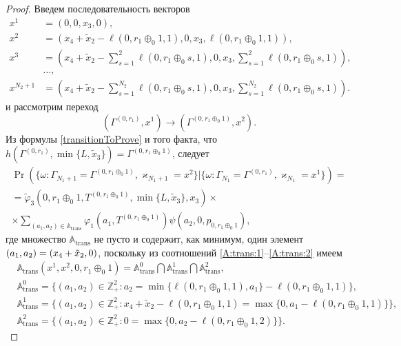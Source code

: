 \begin{proof}
Введем последовательность векторов
\begin{align*}
    x^1 &= (0,  0, x_3,  0), \\
    x^2 &= (x_4 + \tilde{x}_2 - \ell(0, r_1 \oplus_0 1, 1),  0,  x_3,  \ell(0, r_1 \oplus_0 1, 1)), \\
    x^3 &= (x_4 + \tilde{x}_2 - \sum_{s=1}^{2} \ell(0, r_1 \oplus_0 s, 1),  0,  x_3, \sum_{s=1}^{2} \ell(0, r_1 \oplus_0 s, 1)), \\
    &\ldots,  \\
    x^{N_2 + 1} &= (x_4 + \tilde{x}_2 - \sum_{s=1}^{N_2} \ell(0, r_1 \oplus_0 s, 1),  0,  x_3, \sum_{s=1}^{N_2} \ell(0, r_1 \oplus_0 s, 1)).
\end{align*}
и рассмотрим переход 
$$
(\Gamma^{(0,  r_1)},  x^1) \rightarrow (\Gamma^{(0,  r_1 \oplus_0 1)},  x^2).
$$
Из формулы \eqref{transitionToProve} и того факта,  что  $h(\Gamma^{(0,  r_1)},   \min\{L,  \tilde{x}_3\}) = \Gamma^{(0,  r_1 \oplus_0 1)}$,  следует
\begin{multline*}
\Pr(\{\omega\colon \Gamma_{N_1 + 1}=\Gamma^{(0,  r_1 \oplus_0 1)},  \varkappa_{N_1 + 1}=x^{2}\}|
\{\omega\colon \Gamma_{N_1}=\Gamma^{(0,  r_1)},  \varkappa_{N_1}=x^{1}\})=\\
=\widetilde{\varphi}_3(0,  r_1 \oplus_0 1,  T^{(0,  r_1 \oplus_0 1)},  \min\{L,  \tilde{x}_3\},  x_3)
\times \\ \times
\sum_{(a_1,  a_2)\in {\mathbb A}_{\mathrm{trans}}}\varphi_1(a_1,  T^{(0,  r_1 \oplus_0 1)})  \psi(a_2,  0,  p_{0,  r_1 \oplus_0 1}),
\end{multline*}
где множество ${\mathbb A}_{\mathrm{trans}}$ не пусто и содержит,  как минимум,  один элемент $(a_1,  a_2)\hm=(x_4 + \tilde{x}_2,  0)$,  поскольку из соотношений \eqref{A:trans:1}--\eqref{A:trans:2} имеем
\begin{align*}
&{\mathbb A}_{\mathrm{trans}}(x^1,  x^2,  0,  r_1 \oplus_0 1) = {\mathbb A}_{\mathrm{trans}}^0 \bigcap {\mathbb A}_{\mathrm{trans}}^1\bigcap {\mathbb A}_{\mathrm{trans}}^2, \\
&{\mathbb A}_{\mathrm{trans}}^0 = \{(a_1,  a_2) \in \mathbb{Z}_+^2 \colon a_2 = \min{\{\ell(0,  r_1 \oplus_0 1,  1),  a_1}\} -\ell(0, r_1 \oplus_0 1, 1)\}, \\
&{\mathbb A}_{\mathrm{trans}}^1 = \{(a_1,  a_2) \in \mathbb{Z}_+^2 \colon x_4 + \tilde{x}_2 - \ell(0, r_1 \oplus_0 1, 1)=\max{\{0,  a_1-\ell(0,  r_1 \oplus_0 1,  1)\}}\}, \\
& {\mathbb A}_{\mathrm{trans}}^2 = \{(a_1,  a_2) \in \mathbb{Z}_+^2 \colon  0 =\max{\{0,  a_2-\ell(0,  r_1 \oplus_0 1,  2)\}}\}.

\end{align*}
\end{proof}
